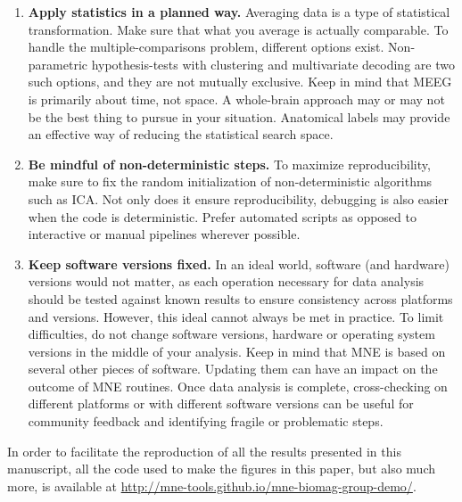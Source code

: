 \begin{enumerate}
\item \textbf{Apply statistics in a planned way.} Averaging data is a type of statistical transformation. Make sure that what you average is actually comparable. To handle the multiple-comparisons problem, different 
options exist. Non-parametric hypothesis-tests with clustering and multivariate decoding are two such options, and they are not mutually exclusive. Keep in mind that MEEG is primarily about time, not space. A whole-brain approach may or may not be the best thing to pursue in your situation. Anatomical labels may provide an effective way of reducing the statistical search space.

\item \textbf{Be mindful of non-deterministic steps.} To maximize reproducibility, make sure to fix the random initialization of non-deterministic algorithms such as ICA. Not only does it ensure reproducibility, debugging is also easier when the code is deterministic. Prefer automated scripts as opposed to interactive or manual pipelines wherever possible.

\item \textbf{Keep software versions fixed.} In an ideal world, software (and hardware) versions would not matter, as each operation necessary for data analysis should be tested against known results to ensure consistency across platforms and versions. However, this ideal cannot always be met in practice. To limit difficulties, do not change software versions, hardware or operating system versions in the middle of your analysis. Keep in mind that MNE is based on several other pieces of software. Updating them can have an impact on the outcome of MNE routines. Once data analysis is complete, cross-checking on different platforms or with different software versions can be useful for community feedback and identifying fragile or problematic steps.

\end{enumerate}

In order to facilitate the reproduction of all the results presented in this manuscript, all the code used to make the figures in this paper, but also much more, is available at \url{http://mne-tools.github.io/mne-biomag-group-demo/}.
